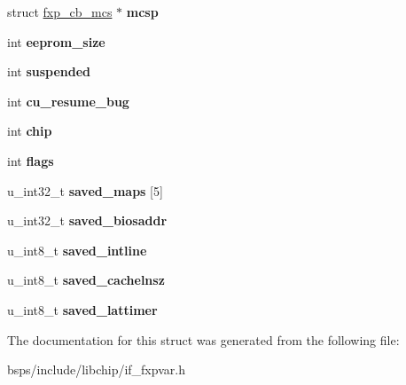 \begin{DoxyCompactItemize}
struct \mbox{\hyperlink{structfxp__cb__mcs}{fxp\+\_\+cb\+\_\+mcs}} $\ast$ {\bfseries mcsp}
\item 
\mbox{\label{structfxp__softc_aacd69d632b0b1078ee62692c0563ba80}} 
int {\bfseries eeprom\+\_\+size}
\item 
\mbox{\label{structfxp__softc_a3c9f6123d57ff4758e326f997c32a7ac}} 
int {\bfseries suspended}
\item 
\mbox{\label{structfxp__softc_a46a7f799e385c4480267d02ebfdf98b9}} 
int {\bfseries cu\+\_\+resume\+\_\+bug}
\item 
\mbox{\label{structfxp__softc_a6b1bb02f177c8f1580f0cc0435f2db6d}} 
int {\bfseries chip}
\item 
\mbox{\label{structfxp__softc_aed5b0cdb7e2b92ac5b713e7fdb2ea4ff}} 
int {\bfseries flags}
\item 
\mbox{\label{structfxp__softc_ad819027a162fbc0a42d5976da3e7ecfb}} 
u\+\_\+int32\+\_\+t {\bfseries saved\+\_\+maps} \mbox{[}5\mbox{]}
\item 
\mbox{\label{structfxp__softc_a4d1f42c3c6b5da8bca142731e98ff46e}} 
u\+\_\+int32\+\_\+t {\bfseries saved\+\_\+biosaddr}
\item 
\mbox{\label{structfxp__softc_af5162a3f1e0aed9b4cdb70705e6fec80}} 
u\+\_\+int8\+\_\+t {\bfseries saved\+\_\+intline}
\item 
\mbox{\label{structfxp__softc_a89e9833bcd0b74f3cb5cfa6f7b81072b}} 
u\+\_\+int8\+\_\+t {\bfseries saved\+\_\+cachelnsz}
\item 
\mbox{\label{structfxp__softc_a21bc5104a4e231d43f166e29c03a5a93}} 
u\+\_\+int8\+\_\+t {\bfseries saved\+\_\+lattimer}
\end{DoxyCompactItemize}


The documentation for this struct was generated from the following file\+:\begin{DoxyCompactItemize}
\item 
bsps/include/libchip/if\+\_\+fxpvar.\+h\end{DoxyCompactItemize}
